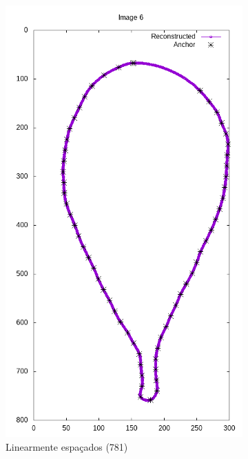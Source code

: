 \begin{frame}
\begin{figure}[ht!]
\begin{subfigure}[t]{0.24\textwidth}
			\includegraphics[width=\textwidth]{img/rec/6lin(781).png}
			\caption{Linearmente espaçados (781)}
		\end{subfigure}
		\begin{subfigure}[t]{0.24\textwidth}
			\centering

\end{subfigure}
\end{figure}
\end{frame}
